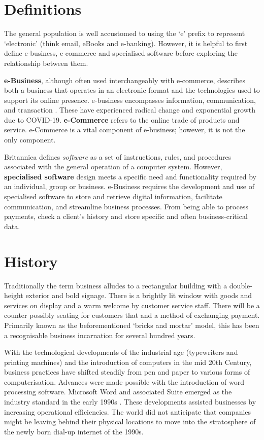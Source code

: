\documentclass[a0,portrait]{a0poster}
\begin{document}
\begin{multicols}{2}
\color{DarkSlateGray} %

\section*{Definitions}
The general population is well accustomed to using the ‘e’ prefix to represent ‘electronic’ (think email, eBooks and e-banking). However, it is helpful to first define e-business, e-commerce and specialised software before exploring the relationship between them. \par
\textbf{e-Business}, although often used interchangeably with e-commerce, describes both a business that operates in an electronic format and the technologies used to support its online presence. e-business encompasses information, communication, and transaction \cite{ionos}. These have experienced radical change and exponential growth due to COVID-19. \textbf{e-Commerce} refers to the online trade of products and service. e-Commerce is a vital component of e-business; however, it is not the only component. \par
Britannica \cite{britannica} defines \emph{software} as a set of instructions, rules, and procedures associated with the general operation of a computer system. However, \textbf{specialised software} design meets a specific need and functionality required by an individual, group or business. e-Business requires the development and use of specialised software to store and retrieve digital information, facilitate communication, and streamline business processes. From being able to process payments, check a client’s history and store specific and often business-critical data. \par

\section*{History}
Traditionally the term business alludes to a rectangular building with a double-height exterior and bold signage. There is a brightly lit window with goods and services on display and a warm welcome by customer service staff. There will be a counter possibly seating for customers that and a method of exchanging payment. Primarily known as the beforementioned ‘bricks and mortar’ model, this has been a recognisable business incarnation for several hundred years. \par 

With the technological developments of the industrial age (typewriters and printing machines) and the introduction of computers in the mid 20th Century, business practices have shifted steadily from pen and paper to various forms of computerisation. Advances were made possible with the introduction of word processing software. Microsoft Word and associated Suite emerged as the industry standard in the early 1990s \cite{redmond}. These developments assisted businesses by increasing operational efficiencies. The world did not anticipate that companies might be leaving behind their physical locations to move into the stratosphere of the newly born dial-up internet of the 1990s. \par 


\end{multicols}
\end{document}
